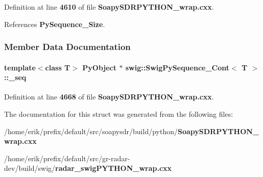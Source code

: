 Definition at line {\bf 4610} of file {\bf Soapy\+S\+D\+R\+P\+Y\+T\+H\+O\+N\+\_\+wrap.\+cxx}.



References {\bf Py\+Sequence\+\_\+\+Size}.



\subsubsection{Member Data Documentation}
\paragraph[{\+\_\+seq}]{\setlength{\rightskip}{0pt plus 5cm}template$<$class T$>$ Py\+Object $\ast$ {\bf swig\+::\+Swig\+Py\+Sequence\+\_\+\+Cont}$<$ T $>$\+::\+\_\+seq\hspace{0.3cm}{\ttfamily [private]}}\label{structswig_1_1SwigPySequence__Cont_ab570302d7e199867f35a1b2db94167d3}


Definition at line {\bf 4668} of file {\bf Soapy\+S\+D\+R\+P\+Y\+T\+H\+O\+N\+\_\+wrap.\+cxx}.



The documentation for this struct was generated from the following files\+:\begin{DoxyCompactItemize}
\item 
/home/erik/prefix/default/src/soapysdr/build/python/{\bf Soapy\+S\+D\+R\+P\+Y\+T\+H\+O\+N\+\_\+wrap.\+cxx}\item 
/home/erik/prefix/default/src/gr-\/radar-\/dev/build/swig/{\bf radar\+\_\+swig\+P\+Y\+T\+H\+O\+N\+\_\+wrap.\+cxx}\end{DoxyCompactItemize}
